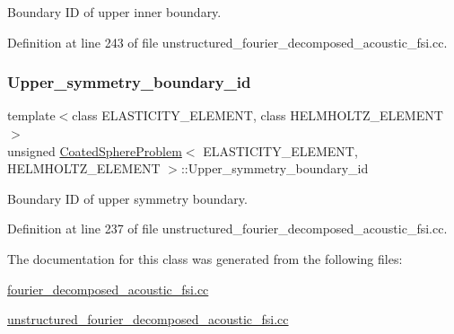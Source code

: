 Boundary ID of upper inner boundary. 



Definition at line 243 of file unstructured\+\_\+fourier\+\_\+decomposed\+\_\+acoustic\+\_\+fsi.\+cc.

\mbox{\label{classCoatedSphereProblem_add071e3a8d3159b181b31559ca233408}} 
\subsubsection{\texorpdfstring{Upper\+\_\+symmetry\+\_\+boundary\+\_\+id}{Upper\_symmetry\_boundary\_id}}
{\footnotesize\ttfamily template$<$class E\+L\+A\+S\+T\+I\+C\+I\+T\+Y\+\_\+\+E\+L\+E\+M\+E\+NT, class H\+E\+L\+M\+H\+O\+L\+T\+Z\+\_\+\+E\+L\+E\+M\+E\+NT$>$ \\
unsigned \hyperlink{classCoatedSphereProblem}{Coated\+Sphere\+Problem}$<$ E\+L\+A\+S\+T\+I\+C\+I\+T\+Y\+\_\+\+E\+L\+E\+M\+E\+NT, H\+E\+L\+M\+H\+O\+L\+T\+Z\+\_\+\+E\+L\+E\+M\+E\+NT $>$\+::Upper\+\_\+symmetry\+\_\+boundary\+\_\+id\hspace{0.3cm}{\ttfamily [private]}}



Boundary ID of upper symmetry boundary. 



Definition at line 237 of file unstructured\+\_\+fourier\+\_\+decomposed\+\_\+acoustic\+\_\+fsi.\+cc.



The documentation for this class was generated from the following files\+:\begin{DoxyCompactItemize}
\item 
\hyperlink{fourier__decomposed__acoustic__fsi_8cc}{fourier\+\_\+decomposed\+\_\+acoustic\+\_\+fsi.\+cc}\item 
\hyperlink{unstructured__fourier__decomposed__acoustic__fsi_8cc}{unstructured\+\_\+fourier\+\_\+decomposed\+\_\+acoustic\+\_\+fsi.\+cc}\end{DoxyCompactItemize}
